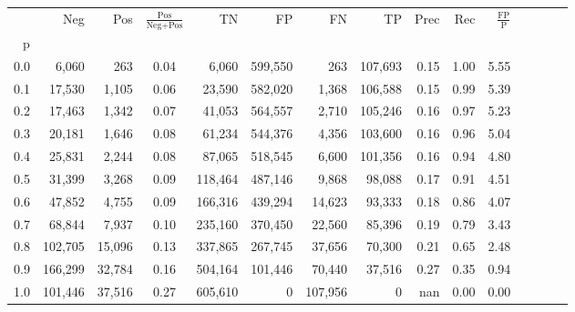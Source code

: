 \begin{tabular}{rrrcrrrrrrrrrrr}
\toprule
{} &      Neg &     Pos & $\frac{\text{Pos}}{\text{Neg}+\text{Pos}}$ &       TN &       FP &       FN &       TP &  Prec &   Rec & $\frac{\text{FP}}{\text{P}}$ \\
p   &          &         &                                            &          &          &          &          &       &       &                              \\
\midrule
0.0 &    6,060 &     263 &                                       0.04 &    6,060 &  599,550 &      263 &  107,693 &  0.15 &  1.00 &                         5.55 \\
0.1 &   17,530 &   1,105 &                                       0.06 &   23,590 &  582,020 &    1,368 &  106,588 &  0.15 &  0.99 &                         5.39 \\
0.2 &   17,463 &   1,342 &                                       0.07 &   41,053 &  564,557 &    2,710 &  105,246 &  0.16 &  0.97 &                         5.23 \\
0.3 &   20,181 &   1,646 &                                       0.08 &   61,234 &  544,376 &    4,356 &  103,600 &  0.16 &  0.96 &                         5.04 \\
0.4 &   25,831 &   2,244 &                                       0.08 &   87,065 &  518,545 &    6,600 &  101,356 &  0.16 &  0.94 &                         4.80 \\
0.5 &   31,399 &   3,268 &                                       0.09 &  118,464 &  487,146 &    9,868 &   98,088 &  0.17 &  0.91 &                         4.51 \\
0.6 &   47,852 &   4,755 &                                       0.09 &  166,316 &  439,294 &   14,623 &   93,333 &  0.18 &  0.86 &                         4.07 \\
0.7 &   68,844 &   7,937 &                                       0.10 &  235,160 &  370,450 &   22,560 &   85,396 &  0.19 &  0.79 &                         3.43 \\
0.8 &  102,705 &  15,096 &                                       0.13 &  337,865 &  267,745 &   37,656 &   70,300 &  0.21 &  0.65 &                         2.48 \\
0.9 &  166,299 &  32,784 &                                       0.16 &  504,164 &  101,446 &   70,440 &   37,516 &  0.27 &  0.35 &                         0.94 \\
1.0 &  101,446 &  37,516 &                                       0.27 &  605,610 &        0 &  107,956 &        0 &   nan &  0.00 &                         0.00 \\
\bottomrule
\end{tabular}
